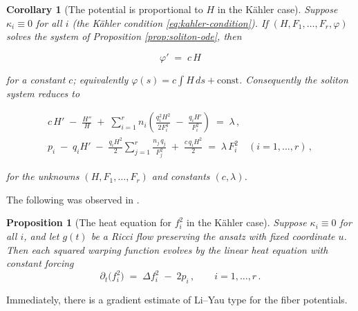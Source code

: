 \documentclass[11pt]{amsart}
\theoremstyle{plain}
\numberwithin{equation}{section}
\newtheorem{proposition}[theorem]{Proposition}
\newtheorem{corollary}[theorem]{Corollary}
\theoremstyle{definition}
\theoremstyle{remark}
\begin{document}
\begin{corollary}[The potential is proportional to $H$ in the Kähler case]\label{cor:potential-prop-H}
	Suppose $\kappa_i \equiv 0$ for all $i$ (the Kähler condition \eqref{eq:kahler-condition}). If $( H, F_1, \dots, F_r, \varphi )$ solves the system of Proposition \ref{prop:soliton-ode}, then
	
	\[
	\varphi' \;=\; c\, H
	\]
	
	for a constant $c$; equivalently $\varphi(s) = c \int H\, ds + \text{const}$. Consequently the soliton system reduces to
	
	\begin{equation*}
		\begin{gathered}
			c\, H' \;-\; \frac{H''}{H} \;+\; \sum_{i=1}^r n_i \left( \frac{q_i^2 H^2}{2 F_i^4} \;-\; \frac{q_i H'}{F_i^2} \right) \;=\; \lambda \,, \\
			p_i \;-\; q_i H' \;-\; \frac{q_i H^2}{2} \sum_{j=1}^r \frac{n_j\, q_j}{F_j^2} \;+\; \frac{c\, q_i H^2}{2} \;=\; \lambda\, F_i^2 \quad ( i = 1, \dots, r ) \,,
		\end{gathered}
	\end{equation*}
	
	for the unknowns $( H, F_1, \dots, F_r )$ and constants $( c, \lambda )$.
	
\end{corollary}
\fi
The following was observed in \cite{FT}.
\begin{proposition}[The heat equation for $f_i^2$ in the Kähler case]\label{prop:heat-equation-fi}
	Suppose $\kappa_i \equiv 0$ for all $i$, and let $g(t)$ be a Ricci flow preserving the ansatz with fixed coordinate $u$. %
	Then each squared warping function evolves by the {linear heat equation with constant forcing}
	\begin{equation}\label{eq:heat-fi}
		\partial_t \big( f_i^2 \big) \;=\; \Delta f_i^2 \;-\; 2 p_i \,, \qquad i = 1, \dots, r \,.
	\end{equation}
\end{proposition}
Immediately, there is a gradient estimate of Li--Yau type \cite{LY} for the fiber potentials. 
\end{document}
